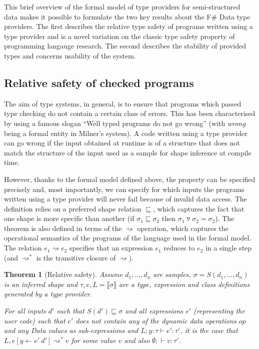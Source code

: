\documentclass[fleqn,11pt]{report}
\newcommand{\ident}[1]{\textnormal{\ttfamily #1}}
\newtheorem{theorem}{Theorem}
\theoremstyle{definition}
\newcommand{\reduce}{\rightsquigarrow}
\newcommand{\sem}[1]{\llbracket #1 \rrbracket}
\newcommand{\semalt}[1]{S(#1)}
\begin{document}
This brief overview of the formal model of type providers for semi-structured data makes it possible
to formulate the two key results about the F\# Data type providers. The first describes the relative
type safety of programs written using a type provider and is a novel variation on the classic
type safety property of programming langauge research. The second describes the
stability of provided types and concerns usability of the system.

\subsection{Relative safety of checked programs}

The aim of type systems, in general, is to ensure that programs which passed type checking do not
contain a certain class of errors. This has been characterised by \citet{milner-1978-gowrong}
using a famous slogan ``Well typed programs do not go wrong'' (with \textit{wrong} being a formal
entity in Milner's system). A code written using a type provider can go wrong if the
input obtained at runtime is of a structure that does not match the structure of the input used
as a sample for shape inference at compile time.

However, thanks to the formal model defined above, the property can be specified precisely and,
most importantly, we can specify for which inputs the programs written using a type provider will
never fail because of invalid data access. The definition relies on a preferred shape relation
$\sqsubseteq$, which captures the fact that one shape is more specific than another (if
$\sigma_1 \sqsubseteq \sigma_2$ then $\sigma_1 \triangledown \sigma_2 = \sigma_2$).
%
The theorem is also defined in terms of the $\reduce$ operation, which captures the operational
semantics of the programs of the language used in the formal model. The relation $e_1 \reduce e_2$
specifies that an expression $e_1$ reduces to $e_2$ in a single step (and $\reduce^{*}$ is the
transitive closure of $\reduce$).

\begin{theorem}[Relative safety]
\label{thm:safety}
Assume $d_1, \ldots, d_n$ are samples, $\sigma=\semalt{d_1, \ldots, d_n}$ is an inferred
shape and $\tau,e,L = \sem{\sigma}$ are a type, expression and class definitions generated by a
type provider.

For all inputs $d'$ such that $\semalt{d'} \sqsubseteq \sigma$ and all expressions $e'$
(representing the user code) such that $e'$ does not contain any of the dynamic data operations $op$
and any \ident{Data} values as sub-expressions and $L; y\!:\!\tau \vdash e'\!:\!\tau'$, it is
the case that $L, e[y\leftarrow e'~d'] \reduce^{*} v$ for some value $v$ and
also $\emptyset; \vdash v : \tau'$.
\end{theorem}
\vspace{-0.2em}
\end{document}
